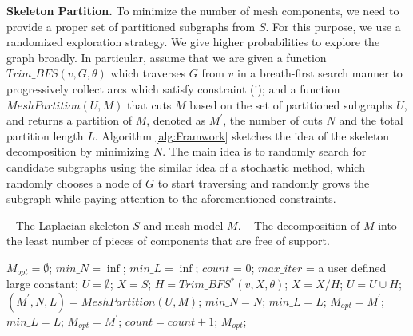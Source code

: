 \textbf{Skeleton Partition.} {{To minimize the number of mesh components, we need to provide a proper set of partitioned subgraphs from $S$.}}
For this purpose, we use a randomized exploration strategy. We give higher probabilities to explore the graph broadly. In particular, assume that we are given a function $Trim\_BFS(v, G, \theta)$ which traverses $G$ from $v$ in a breath-first search manner to progressively collect arcs which satisfy constraint (i); and a function $MeshPartition(U, M)$ that cuts $M$ based on the set of partitioned subgraphs $U$, and returns a partition of $M$, denoted as $M^{'}$, the number of cuts $N$ and the total partition length $L$. Algorithm \ref{alg:Framwork} sketches the idea of the skeleton decomposition {{by minimizing $N$}}. The main idea is to randomly search for candidate subgraphs using the similar idea of a stochastic method, which randomly chooses a node of $G$ to start traversing and randomly grows the subgraph while paying attention to the aforementioned constraints.

\begin{algorithm}
\caption{$Skeleton\_Mesh\_Decomposition(S, M)$}
\label{alg:Framwork}
\begin{algorithmic}[1]
\REQUIRE~
The Laplacian skeleton $S$ and mesh model $M$.
\ENSURE~
The decomposition of $M$ into the least number of pieces of components that are free of support.

\STATE $M_{opt} = \emptyset$; $min\_N = \inf$; $min\_L = \inf$; $count$ = 0; $max\_iter$ = a user defined large constant;
\STATE  $U= \emptyset$;
\STATE  $X= S$;
\STATE $H = Trim\_BFS^*(v, X, \theta)$;
\STATE $X = X / H$;
\STATE $U = U \cup H$;
\ENDWHILE
\STATE $(M^{'}, N, L) = MeshPartition(U , M)$;
\STATE  $min\_N = N$;
\STATE  $min\_L = L$;
\STATE  $M_{opt} = M^{'}$;
\STATE  $min\_L = L$;
\STATE  $M_{opt} = M^{'}$;
\ENDIF
\STATE $count =count + 1$;
\ENDWHILE
\RETURN  $M_{opt}$;
\label{code:fram:select} \\
\end{algorithmic}
\end{algorithm}

